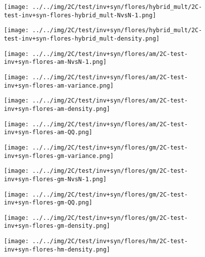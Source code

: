\begin{figure}[H]
\centering	\texttt{[image: ../../img/2C/test/inv+syn/flores/hybrid\_mult/2C-test-inv+syn-flores-hybrid\_mult-NvsN-1.png]}
\end{figure}
\begin{figure}[H]
\centering	\texttt{[image: ../../img/2C/test/inv+syn/flores/hybrid\_mult/2C-test-inv+syn-flores-hybrid\_mult-density.png]}
\end{figure}
\begin{figure}[H]
\centering	\texttt{[image: ../../img/2C/test/inv+syn/flores/am/2C-test-inv+syn-flores-am-NvsN-1.png]}
\end{figure}
\begin{figure}[H]
\centering	\texttt{[image: ../../img/2C/test/inv+syn/flores/am/2C-test-inv+syn-flores-am-variance.png]}
\end{figure}
\begin{figure}[H]
\centering	\texttt{[image: ../../img/2C/test/inv+syn/flores/am/2C-test-inv+syn-flores-am-density.png]}
\end{figure}
\begin{figure}[H]
\centering	\texttt{[image: ../../img/2C/test/inv+syn/flores/am/2C-test-inv+syn-flores-am-QQ.png]}
\end{figure}
\begin{figure}[H]
\centering	\texttt{[image: ../../img/2C/test/inv+syn/flores/gm/2C-test-inv+syn-flores-gm-variance.png]}
\end{figure}
\begin{figure}[H]
\centering	\texttt{[image: ../../img/2C/test/inv+syn/flores/gm/2C-test-inv+syn-flores-gm-NvsN-1.png]}
\end{figure}
\begin{figure}[H]
\centering	\texttt{[image: ../../img/2C/test/inv+syn/flores/gm/2C-test-inv+syn-flores-gm-QQ.png]}
\end{figure}
\begin{figure}[H]
\centering	\texttt{[image: ../../img/2C/test/inv+syn/flores/gm/2C-test-inv+syn-flores-gm-density.png]}
\end{figure}
\begin{figure}[H]
\centering	\texttt{[image: ../../img/2C/test/inv+syn/flores/hm/2C-test-inv+syn-flores-hm-density.png]}
\end{figure}
